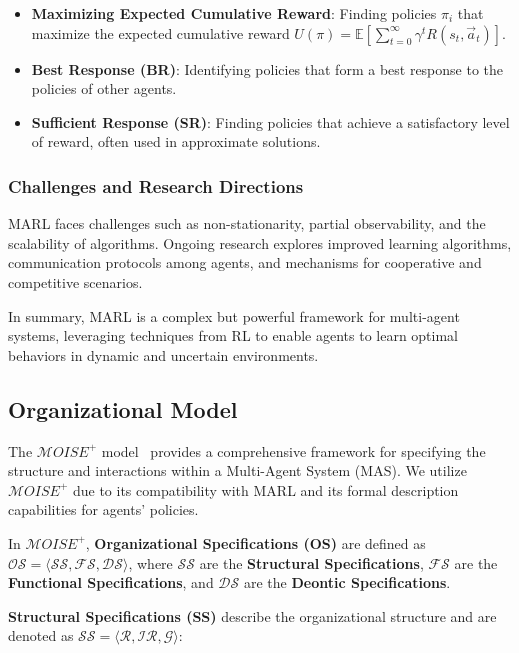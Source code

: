 \documentclass[conference]{IEEEtran}
\begin{document}
\begin{itemize}
    \item \textbf{Maximizing Expected Cumulative Reward}: Finding policies $\pi_i$ that maximize the expected cumulative reward $U(\pi) = \mathbb{E}\left[\sum_{t=0}^{\infty} \gamma^t R(s_t, \vec{a}_t)\right]$.
    \item \textbf{Best Response (BR)}: Identifying policies that form a best response to the policies of other agents.
    \item \textbf{Sufficient Response (SR)}: Finding policies that achieve a satisfactory level of reward, often used in approximate solutions.
\end{itemize}

\subsubsection{Challenges and Research Directions}

MARL faces challenges such as non-stationarity, partial observability, and the scalability of algorithms. Ongoing research explores improved learning algorithms, communication protocols among agents, and mechanisms for cooperative and competitive scenarios.

In summary, MARL is a complex but powerful framework for multi-agent systems, leveraging techniques from RL to enable agents to learn optimal behaviors in dynamic and uncertain environments.


\subsection{Organizational Model}

The $\mathcal{M}OISE^+$ model~\cite{Hubner2007} provides a comprehensive framework for specifying the structure and interactions within a Multi-Agent System (MAS). We utilize $\mathcal{M}OISE^+$ due to its compatibility with MARL and its formal description capabilities for agents' policies.

In $\mathcal{M}OISE^+$, \textbf{Organizational Specifications (OS)} are defined as $\mathcal{OS} = \langle \mathcal{SS}, \mathcal{FS}, \mathcal{DS} \rangle$, where $\mathcal{SS}$ are the \textbf{Structural Specifications}, $\mathcal{FS}$ are the \textbf{Functional Specifications}, and $\mathcal{DS}$ are the \textbf{Deontic Specifications}.

\textbf{Structural Specifications (SS)} describe the organizational structure and are denoted as $\mathcal{SS} = \langle \mathcal{R}, \mathcal{IR}, \mathcal{G} \rangle$:
\end{document}
